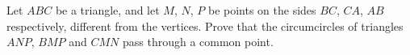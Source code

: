 Let $ABC$ be a triangle, and let $M$, $N$, $P$ be points on the sides $BC$, $CA$, $AB$ respectively, different from the vertices. Prove that the circumcircles of triangles $ANP$, $BMP$ and $CMN$ pass through a common point.
